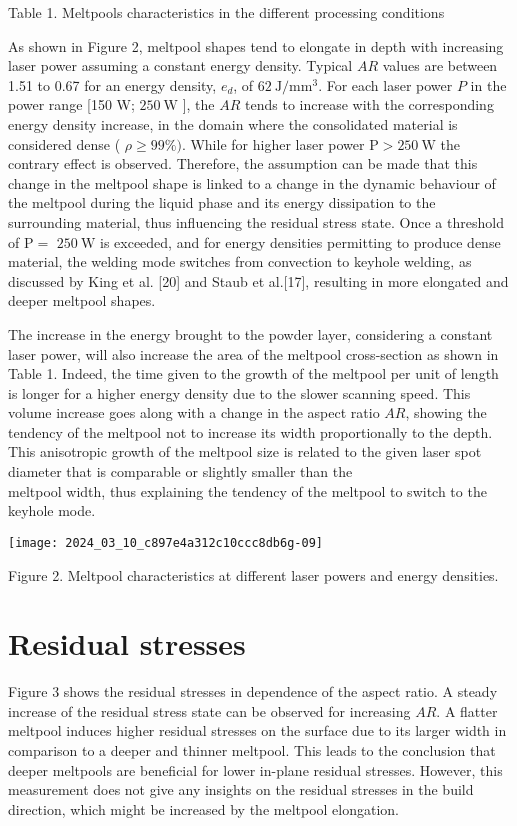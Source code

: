 \documentclass[10pt]{article}
\begin{document}
Table 1. Meltpools characteristics in the different processing conditions

As shown in Figure 2, meltpool shapes tend to elongate in depth with increasing laser power assuming a constant energy density. Typical $A R$ values are between 1.51 to 0.67 for an energy density, $e_{d}$, of $62 \mathrm{~J} / \mathrm{mm}^{3}$. For each laser power $P$ in the power range [150 W; $250 \mathrm{~W}$ ], the $A R$ tends to increase with the corresponding energy density increase, in the domain where the consolidated material is considered dense ( $\rho \geq 99 \%)$. While for higher laser power $\mathrm{P}>250 \mathrm{~W}$ the contrary effect is observed. Therefore, the assumption can be made that this change in the meltpool shape is linked to a change in the dynamic behaviour of the meltpool during the liquid phase and its energy dissipation to the surrounding material, thus influencing the residual stress state. Once a threshold of $\mathrm{P}=$ $250 \mathrm{~W}$ is exceeded, and for energy densities permitting to produce dense material, the welding mode switches from convection to keyhole welding, as discussed by King et al. [20] and Staub et al.[17], resulting in more elongated and deeper meltpool shapes.

The increase in the energy brought to the powder layer, considering a constant laser power, will also increase the area of the meltpool cross-section as shown in Table 1. Indeed, the time given to the growth of the meltpool per unit of length is longer for a higher energy density due to the slower scanning speed. This volume increase goes along with a change in the aspect ratio $A R$, showing the tendency of the meltpool not to increase its width proportionally to the depth. This anisotropic growth of the meltpool size is related to the given laser spot diameter that is comparable or slightly smaller than the\\
meltpool width, thus explaining the tendency of the meltpool to switch to the keyhole mode.

\begin{center}
\texttt{[image: 2024\_03\_10\_c897e4a312c10ccc8db6g-09]}
\end{center}

Figure 2. Meltpool characteristics at different laser powers and energy densities.

\section*{Residual stresses}
Figure 3 shows the residual stresses in dependence of the aspect ratio. A steady increase of the residual stress state can be observed for increasing $A R$. A flatter meltpool induces higher residual stresses on the surface due to its larger width in comparison to a deeper and thinner meltpool. This leads to the conclusion that deeper meltpools are beneficial for lower in-plane residual stresses. However, this measurement does not give any insights on the residual stresses in the build direction, which might be increased by the meltpool elongation.
\end{document}

